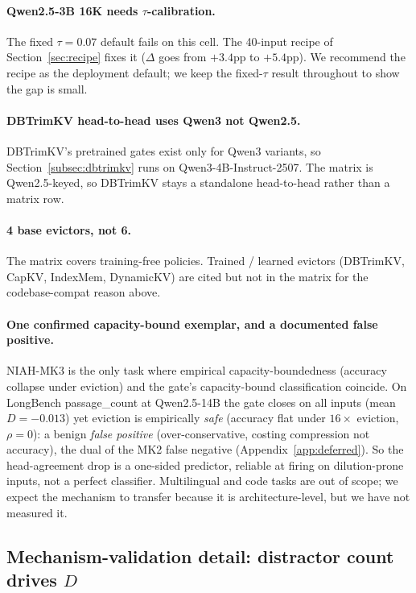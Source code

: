 \documentclass{article}
\begin{document}
\paragraph{Qwen2.5-3B 16K needs $\tau$-calibration.} The fixed
$\tau = 0.07$ default fails on this cell. The 40-input recipe of
Section~\ref{sec:recipe} fixes it ($\Delta$ goes from $+3.4$pp to
$+5.4$pp). We recommend the recipe as the deployment default; we keep
the fixed-$\tau$ result throughout to show the gap is small.

\paragraph{DBTrimKV head-to-head uses Qwen3 not Qwen2.5.} DBTrimKV's
pretrained gates exist only for Qwen3 variants, so
Section~\ref{subsec:dbtrimkv} runs on Qwen3-4B-Instruct-2507. The
matrix is Qwen2.5-keyed, so DBTrimKV stays a standalone head-to-head
rather than a matrix row.

\paragraph{4 base evictors, not 6.} The matrix covers training-free
policies. Trained / learned evictors (DBTrimKV, CapKV, IndexMem,
DynamicKV) are cited but not in the matrix for the codebase-compat
reason above.

\paragraph{One confirmed capacity-bound exemplar, and a documented false
positive.} NIAH-MK3 is the only task where empirical capacity-boundedness
(accuracy collapse under eviction) and the gate's capacity-bound classification
coincide. On LongBench passage\_count at Qwen2.5-14B the gate closes on all
inputs (mean $D = -0.013$) yet eviction is empirically \emph{safe} (accuracy
flat under $16\times$ eviction, $\rho = 0$): a benign \emph{false positive}
(over-conservative, costing compression not accuracy), the dual of the MK2
false negative (Appendix~\ref{app:deferred}). So the head-agreement drop is a
one-sided predictor, reliable at firing on dilution-prone inputs, not a perfect
classifier. Multilingual and code tasks are out of scope; we expect the
mechanism to transfer because it is architecture-level, but we have not measured
it.

\subsection{Mechanism-validation detail: distractor count drives $D$}
\end{document}
